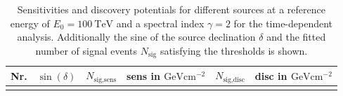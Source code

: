 \begin{table}
  \centering
  \caption{Sensitivities and discovery potentials for different sources at a reference energy of $E_0 = \SI{100}{\tera\electronvolt}$ and a spectral index $\gamma=2$ for the time-dependent analysis. Additionally the sine of the source declination $\delta$ and the fitted number of signal events $N_\text{sig}$ satisfying the thresholds is shown.}
  \begin{tabular}{ccrcrc}
    \toprule
    Nr. & $\sin{(\delta)}$ & $N_\text{sig,sens}$ &  sens in $\si{\giga\electronvolt\centi\meter\tothe{-2}}$ & $N_\text{sig,disc}$ & disc in $\si{\giga\electronvolt\centi\meter\tothe{-2}}$ \\
    \toprule
      
    \toprule
    \label{tab:sens_disc_time_dep}
  \end{tabular}
\end{table}

